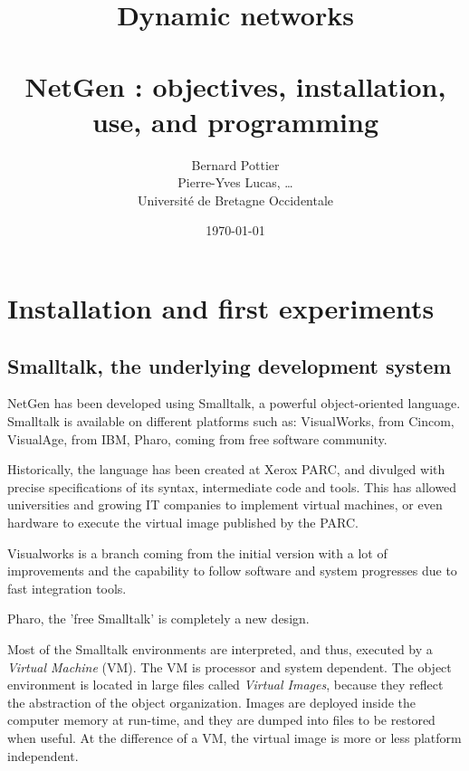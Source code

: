 \documentclass[times,a4paper]{book}
\title{  \Huge Dynamic networks\\~\\
\huge NetGen : objectives, installation, use, 
and programming }
\author{ Bernard Pottier\\
Pierre-Yves Lucas, \ldots \\
Universit\'e de Bretagne Occidentale }
\date{\today}
\begin{document}
\maketitle




\chapter{Installation and first experiments}

\label{sec:chapter1}

\section { Smalltalk, the underlying development system}

NetGen has been developed using Smalltalk, a powerful object-oriented language. Smalltalk is available 
on different platforms such as: VisualWorks, from Cincom, VisualAge, from IBM, Pharo, coming from
free software community.

Historically, the language has been created at Xerox PARC, and divulged with precise specifications of
its syntax, intermediate code and tools. This has allowed universities and growing IT companies to
implement virtual machines, or even hardware to execute the virtual image published by the PARC.

Visualworks is a branch coming from the initial version with a lot of improvements and the capability
to follow software and system progresses due to fast integration tools. 

Pharo, the 'free Smalltalk'  is completely a new design.
 
Most of the Smalltalk environments are interpreted, and thus, executed by a {\sl Virtual Machine} (VM).
The VM is processor and system dependent. The object environment is located in large files 
called {\sl Virtual Images}, because they reflect the abstraction of the object organization.
Images are deployed inside the computer memory at run-time, and they are dumped into files
to be restored when useful.  At the difference of a VM, the virtual image is more or less 
platform independent.
\end{document}
